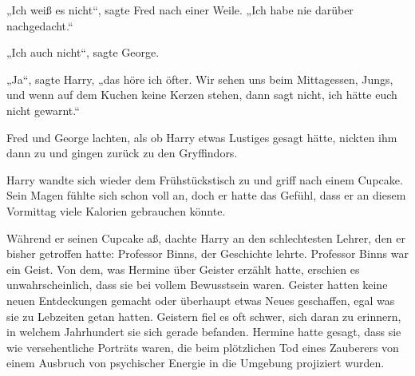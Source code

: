 „Ich weiß es nicht“, sagte Fred nach einer Weile. „Ich habe nie darüber nachgedacht.“

„Ich auch nicht“, sagte George.

„Ja“, sagte Harry, „das höre ich öfter. Wir sehen uns beim Mittagessen, Jungs, und wenn auf dem Kuchen keine Kerzen stehen, dann sagt nicht, ich hätte euch nicht gewarnt.“

Fred und George lachten, als ob Harry etwas Lustiges gesagt hätte, nickten ihm dann zu und gingen zurück zu den Gryffindors.

Harry wandte sich wieder dem Frühstückstisch zu und griff nach einem Cupcake. Sein Magen fühlte sich schon voll an, doch er hatte das Gefühl, dass er an diesem Vormittag viele Kalorien gebrauchen könnte.

Während er seinen Cupcake aß, dachte Harry an den schlechtesten Lehrer, den er bisher getroffen hatte: Professor Binns, der Geschichte lehrte. Professor Binns war ein Geist. Von dem, was Hermine über Geister erzählt hatte, erschien es unwahrscheinlich, dass sie bei vollem Bewusstsein waren. Geister hatten keine neuen Entdeckungen gemacht oder überhaupt etwas Neues geschaffen, egal was sie zu Lebzeiten getan hatten. Geistern fiel es oft schwer, sich daran zu erinnern, in welchem Jahrhundert sie sich gerade befanden. Hermine hatte gesagt, dass sie wie versehentliche Porträts waren, die beim plötzlichen Tod eines Zauberers von einem Ausbruch von psychischer Energie in die Umgebung projiziert wurden.

